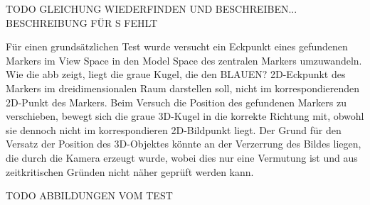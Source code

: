 TODO GLEICHUNG WIEDERFINDEN UND BESCHREIBEN... BESCHREIBUNG FÜR S FEHLT

Für einen grundsätzlichen Test wurde versucht ein Eckpunkt eines gefundenen Markers im View Space in den Model Space des zentralen Markers umzuwandeln. Wie die \acs{abb} zeigt, liegt die graue Kugel, die den BLAUEN? 2D-Eckpunkt des Markers im dreidimensionalen Raum darstellen soll, nicht im korrespondierenden 2D-Punkt des Markers. Beim Versuch die Position des gefundenen Markers zu verschieben, bewegt sich die graue 3D-Kugel in die korrekte Richtung mit, obwohl sie dennoch nicht im korrespondieren 2D-Bildpunkt liegt. Der Grund für den Versatz der Position des 3D-Objektes könnte an der Verzerrung des Bildes liegen, die durch die Kamera erzeugt wurde, wobei dies nur eine Vermutung ist und aus zeitkritischen Gründen nicht näher geprüft werden kann.

TODO ABBILDUNGEN VOM TEST

\newpage